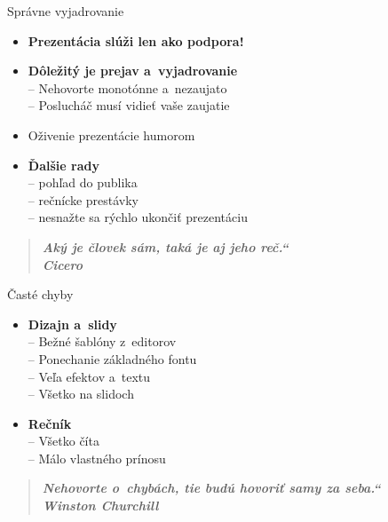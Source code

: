 \documentclass[mode=present,paper=a4paper,orient=landscape, style=sailor]{powerdot}
\newcommand{\myuv}[1]{\quotedblbase#1\textquotedblleft}
\begin{document}
\begin{slide}{Správne vyjadrovanie}
\begin{itemize}
\item \textbf{Prezentácia slúži len ako podpora!}
\item \textbf{Dôležitý je prejav a~vyjadrovanie}\\
		-- Nehovorte monotónne a~nezaujato\\
		-- Poslucháč musí vidieť vaše zaujatie\\ 
\item Oživenie prezentácie humorom
\end{itemize}
\begin{itemize}
\item \textbf{Ďalšie rady}\\
	    -- pohľad do publika\\
	    -- rečnícke prestávky\\
	    -- nesnažte sa rýchlo ukončiť prezentáciu\\
\end{itemize}
\begin{quotation}
\textit{\bfseries \myuv{Aký je človek sám, taká je aj jeho reč.}\\ \hspace{12em}Cicero}
\end{quotation}
\end{slide}

\begin{slide}{Časté chyby}
\begin{itemize}
\item \textbf{Dizajn a~slidy}\\
        -- Bežné šablóny z~editorov\\
        -- Ponechanie základného fontu\\
        -- Veľa efektov a~textu\\
        -- Všetko na slidoch\\
\vspace{1em}
\item \textbf{Rečník}\\
        -- Všetko číta\\
        -- Málo vlastného prínosu\\
\end{itemize}
\begin{quotation}
\textit{\bfseries \myuv{Nehovorte o~chybách, tie budú hovoriť samy za seba.}\\ \hspace{12em}Winston Churchill}
\end{quotation}
\end{slide}
\end{document}
